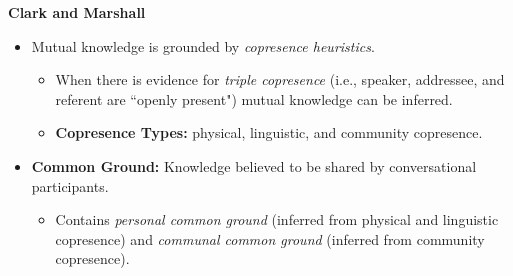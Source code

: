 \documentclass{article}
\begin{document}
\begin{multicols}{2}
\flushleft\textbf{Clark and Marshall}
\begin{itemize}
	\item Mutual knowledge is grounded by \textit{copresence heuristics}. 
	\begin{itemize}
		\item When there is evidence for \textit{triple copresence} (i.e., speaker, addressee, and referent are \textquotedblleft openly present") mutual knowledge can be inferred.
		\item \textbf{Copresence Types:} physical, linguistic, and community copresence.
	\end{itemize}
	\item \textbf{Common Ground:} Knowledge believed to be shared by conversational participants.
	\begin{itemize}
		\item Contains \textit{personal common ground} (inferred from physical and linguistic copresence) and \textit{communal common ground} (inferred from community copresence).
	\end{itemize}
\end{itemize}

\end{multicols}
\end{document}
